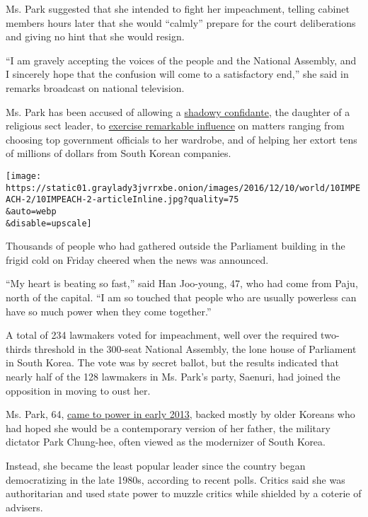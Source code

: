 Ms. Park suggested that she intended to fight her impeachment, telling
cabinet members hours later that she would ``calmly'' prepare for the
court deliberations and giving no hint that she would resign.

``I am gravely accepting the voices of the people and the National
Assembly, and I sincerely hope that the confusion will come to a
satisfactory end,'' she said in remarks broadcast on national
television.

Ms. Park has been accused of allowing a
\href{http://www.nytimes3xbfgragh.onion/2016/11/06/world/asia/south-koreans-ashamed-over-les-secretive-adviser.html}{shadowy
confidante}, the daughter of a religious sect leader, to
\href{http://www.nytimes3xbfgragh.onion/2016/10/28/world/asia/south-korea-choi-soon-sil.html}{exercise
remarkable influence} on matters ranging from choosing top government
officials to her wardrobe, and of helping her extort tens of millions of
dollars from South Korean companies.

\texttt{[image: https://static01.graylady3jvrrxbe.onion/images/2016/12/10/world/10IMPEACH-2/10IMPEACH-2-articleInline.jpg?quality=75\\\&auto=webp\\\&disable=upscale]}

Thousands of people who had gathered outside the Parliament building in
the frigid cold on Friday cheered when the news was announced.

``My heart is beating so fast,'' said Han Joo-young, 47, who had come
from Paju, north of the capital. ``I am so touched that people who are
usually powerless can have so much power when they come together.''

A total of 234 lawmakers voted for impeachment, well over the required
two-thirds threshold in the 300-seat National Assembly, the lone house
of Parliament in South Korea. The vote was by secret ballot, but the
results indicated that nearly half of the 128 lawmakers in Ms. Park's
party, Saenuri, had joined the opposition in moving to oust her.

Ms. Park, 64,
\href{http://www.nytimes3xbfgragh.onion/2013/02/26/world/asia/south-koreas-park-geun-hye-warns-north-against-nuclear-pursuits.html}{came
to power in early 2013}, backed mostly by older Koreans who had hoped
she would be a contemporary version of her father, the military dictator
Park Chung-hee, often viewed as the modernizer of South Korea.

Instead, she became the least popular leader since the country began
democratizing in the late 1980s, according to recent polls. Critics said
she was authoritarian and used state power to muzzle critics while
shielded by a coterie of advisers.

